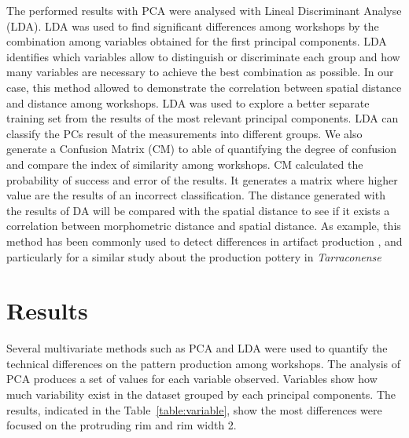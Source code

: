 \documentclass[review]{elsarticle}
\begin{document}
The performed results with PCA were analysed with Lineal Discriminant Analyse (LDA). LDA was used to find significant differences among workshops by the combination among variables obtained for the first principal components. LDA identifies which variables allow to distinguish or discriminate each group and how many variables are necessary to achieve the best combination as possible. In our case, this method allowed to demonstrate the correlation between spatial distance and distance among workshops. LDA was used to explore a better separate training set from the results of the most relevant principal components. LDA can classify the PCs result of the measurements into different groups.  We also generate a Confusion Matrix (CM) to able of quantifying the degree of confusion and compare the index of similarity among workshops.  CM calculated the probability of success and error of the results. It generates a matrix where higher value are the results of an incorrect classification. The distance generated with the results of DA will be compared with the spatial distance to see if it exists a correlation between morphometric distance and spatial distance. As example, this method has been commonly used to detect differences in artifact production \citep{charlton_investigating_2012, thorpe_distribution_1984}, and particularly for a similar study about the production pottery in \emph{Tarraconense} \citep{i_martin_alisis_1998}



\section{Results}

Several multivariate methods such as PCA and LDA were used to quantify the technical differences on the pattern production among workshops. The analysis of PCA produces a set of values for each variable observed. Variables show how much variability exist in the dataset grouped by each principal components. The results, indicated in the Table~\ref{table:variable}, show the most differences were focused on the protruding rim and rim width 2. 
\end{document}

